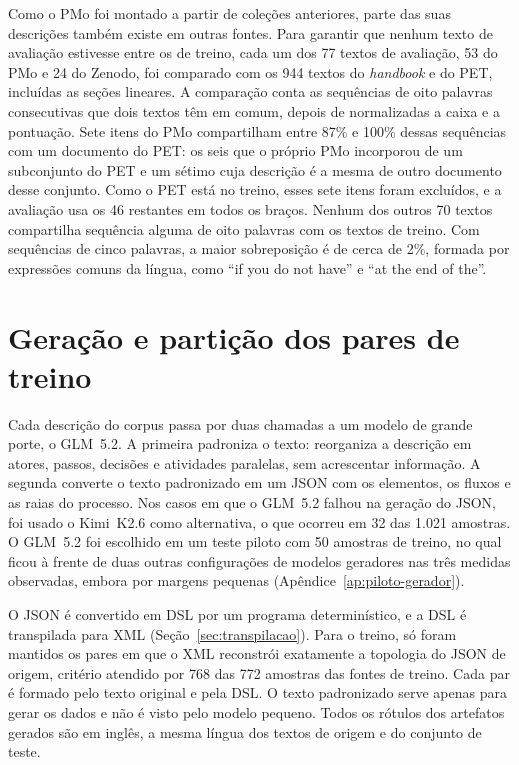 Como o PMo foi montado a partir de coleções anteriores, parte das suas descrições também existe em outras fontes. Para garantir que nenhum texto de avaliação estivesse entre os de treino, cada um dos 77 textos de avaliação, 53 do PMo e 24 do Zenodo, foi comparado com os 944 textos do \textit{handbook} e do PET, incluídas as seções lineares. A comparação conta as sequências de oito palavras consecutivas que dois textos têm em comum, depois de normalizadas a caixa e a pontuação. Sete itens do PMo compartilham entre 87\% e 100\% dessas sequências com um documento do PET: os seis que o próprio PMo incorporou de um subconjunto do PET e um sétimo cuja descrição é a mesma de outro documento desse conjunto. Como o PET está no treino, esses sete itens foram excluídos, e a avaliação usa os 46 restantes em todos os braços. Nenhum dos outros 70 textos compartilha sequência alguma de oito palavras com os textos de treino. Com sequências de cinco palavras, a maior sobreposição é de cerca de 2\%, formada por expressões comuns da língua, como ``if you do not have'' e ``at the end of the''.

\section{Geração e partição dos pares de treino}\label{subsec:geracao_pares}

Cada descrição do corpus passa por duas chamadas a um modelo de grande porte, o GLM~5.2. A primeira padroniza o texto: reorganiza a descrição em atores, passos, decisões e atividades paralelas, sem acrescentar informação. A segunda converte o texto padronizado em um JSON com os elementos, os fluxos e as raias do processo. Nos casos em que o GLM~5.2 falhou na geração do JSON, foi usado o Kimi~K2.6 como alternativa, o que ocorreu em 32 das 1.021 amostras. O GLM~5.2 foi escolhido em um teste piloto com 50 amostras de treino, no qual ficou à frente de duas outras configurações de modelos geradores nas três medidas observadas, embora por margens pequenas (Apêndice~\ref{ap:piloto-gerador}).

O JSON é convertido em DSL por um programa determinístico, e a DSL é transpilada para XML (Seção~\ref{sec:transpilacao}). Para o treino, só foram mantidos os pares em que o XML reconstrói exatamente a topologia do JSON de origem, critério atendido por 768 das 772 amostras das fontes de treino. Cada par é formado pelo texto original e pela DSL. O texto padronizado serve apenas para gerar os dados e não é visto pelo modelo pequeno. Todos os rótulos dos artefatos gerados são em inglês, a mesma língua dos textos de origem e do conjunto de teste.

